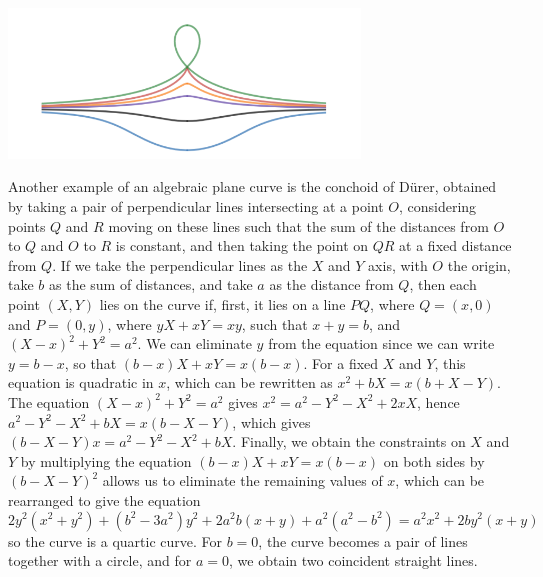 \begin{example}
    \begin{center}
        \includegraphics[width=0.7\textwidth]{ConchoidDesluze}
    \end{center}
\end{example}

\begin{example}
    Another example of an algebraic plane curve is the conchoid of D\"{u}rer, obtained by taking a pair of perpendicular lines intersecting at a point $O$, considering points $Q$ and $R$ moving on these lines such that the sum of the distances from $O$ to $Q$ and $O$ to $R$ is constant, and then taking the point on $QR$ at a fixed distance from $Q$. If we take the perpendicular lines as the $X$ and $Y$ axis, with $O$ the origin, take $b$ as the sum of distances, and take $a$ as the distance from $Q$, then each point $(X,Y)$ lies on the curve if, first, it lies on a line $PQ$, where $Q = (x,0)$ and $P = (0,y)$, where $yX + xY = xy$, such that $x + y = b$, and $(X - x)^2 + Y^2 = a^2$. We can eliminate $y$ from the equation since we can write $y = b -x$, so that $(b-x)X + xY = x(b-x)$. For a fixed $X$ and $Y$, this equation is quadratic in $x$, which can be rewritten as $x^2 + bX = x(b + X - Y)$. The equation $(X - x)^2 + Y^2 = a^2$ gives $x^2 = a^2 - Y^2 - X^2 + 2xX$, hence $a^2 - Y^2 - X^2 + bX = x(b - X - Y)$, which gives $(b - X - Y)x = a^2 - Y^2 - X^2 + bX$. Finally, we obtain the constraints on $X$ and $Y$ by multiplying the equation $(b - x)X + xY = x(b - x)$ on both sides by $(b - X - Y)^2$ allows us to eliminate the remaining values of $x$, which can be rearranged to give the equation
    \[ 2y^2(x^2 + y^2) + (b^2 - 3a^2)y^2 + 2a^2b(x + y) + a^2(a^2 - b^2) = a^2x^2 + 2by^2(x + y) \]
    so the curve is a quartic curve. For $b = 0$, the curve becomes a pair of lines together with a circle, and for $a = 0$, we obtain two coincident straight lines.
\end{example}

